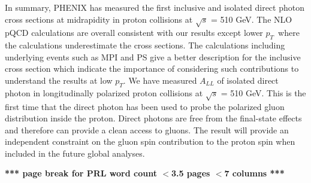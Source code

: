 \documentclass[twocolumn,letterpaper,aps,prl,longbibliography,superscriptaddress,floatfix]{revtex4-2}
\newcommand{\pT}{\ensuremath{p_T}}
\newcommand{\pizero}{\ensuremath{\pi^0}}
\begin{document}

In summary, PHENIX has measured the first inclusive and isolated direct photon cross sections at midrapidity in proton collisions at $\sqrt{s}$ = 510 GeV. The NLO pQCD calculations are overall consistent with our results except lower \pT\ where the calculations underestimate the cross sections. The calculations including underlying events such as MPI and PS give a better description for the inclusive cross section which indicate the importance of considering such contributions to understand the results at low $p_{T}$. We have measured $A_{LL}$ of isolated direct photon in longitudinally polarized proton collisions at $\sqrt{s}$ = 510 GeV. This is the first time that the direct photon has been used to probe the polarized gluon distribution inside the proton. Direct photons are free from the final-state effects and therefore can provide a clean access to gluons. The result will provide an independent constraint on the gluon spin contribution to the proton spin when included in the future global analyses.

\clearpage \textbf{*** page break for PRL word count $<$3.5 pages $<$7 columns ***}




\end{document}
